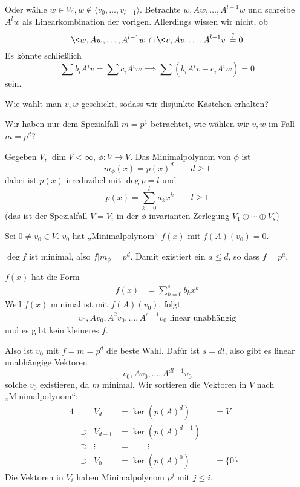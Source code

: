 \documentclass{mycourse}
\begin{document}
\begin{ex}
\begin{enumerate}[1{. Schritt}]
			Oder wähle $w\in W, w\not\in \langle v_0,\dotsc, v_{l-1} \rangle$.
			Betrachte $w,Aw,\dotsc, A^{l-1}w$ und schreibe $A^lw$ als Linearkombination der vorigen.
			Allerdings wissen wir nicht, ob
			\[
				\<w,Aw,\dotsc,A^{l-1}w\> \cap \<v,Av,\dotsc,A^{l-1}v\> \stackrel ?= 0
			\]
			Es könnte schließlich
			\[
				\sum b_i A^i v = \sum c_iA^i w \implies \sum (b_iA^iv - c_i A^i w) = 0
			\]
			sein.

			Wie wählt man $v,w$ geschickt, sodass wir disjunkte Kästchen erhalten?
			
			Wir haben nur dem Spezialfall $m=p^1$ betrachtet, wie wählen wir $v,w$ im Fall $m=p^d$?
	\end{enumerate}
	
	Gegeben $V$, $\dim V<\infty$, $\phi: V\to V$.
	Das Minimalpolynom von $\phi$ ist
	\[
		m_\phi(x) = p(x)^d \qquad d\ge 1
	\]
	dabei ist $p(x)$ irreduzibel mit $\deg p = l$ und
	\[
		p(x) = \sum_{k=0}^l a_k x^k \qquad l\ge 1
	\]
	(das ist der Spezialfall $V=V_i$ in der $\phi$-invarianten Zerlegung $V_1\oplus\dotsb\oplus V_s$)

	Sei $0\neq v_0\in V$.
	$v_0$ hat „Minimalpolynom“ $f(x)$ mit $f(A)(v_0) = 0$.

	$\deg f$ ist minimal, also $f|m_\phi = p^d$.
	Damit existiert ein $a\le d$, so dass $f=p^a$.
	
	$f(x)$ hat die Form
	\begin{align*}
		f(x)&=\sum_{k=0}^s b_kx^k
	\end{align*}
	Weil $f(x)$ minimal ist mit $f(A)(v_0)$, folgt
	\begin{align*}
		v_0, Av_0, A^2v_0, \dotsc, A^{s-1}v_0 \text{ linear unabhängig}
	\end{align*}
	und es gibt kein kleineres $f$.

	Also ist $v_0$ mit $f=m=p^d$ die beste Wahl.
	Dafür ist $s=dl$, also gibt es linear unabhängige Vektoren
	\[
		v_0, Av_0, \dotsc, A^{dl-1}v_0
	\]
	solche $v_0$ existieren, da $m$ minimal.
	Wir sortieren die Vektoren in $V$ nach „Minimalpolynom“:
	\begin{alignat*}{4}
		&		&V_d&= \ker(p(A)^d)& &= V \\
  &\supset &V_{d-1} &= \ker(p(A)^{d-1})& \\
	 &\supset &\vdots\;&=\qquad \vdots &&\\
		&\supset &V_0 &= \ker(p(A)^0) &&= \{0\}
	 &\end{alignat*}
	Die Vektoren in $V_i$ haben Minimalpolynom $p^j$ mit $j\le i$.

\end{ex}
\end{document}
